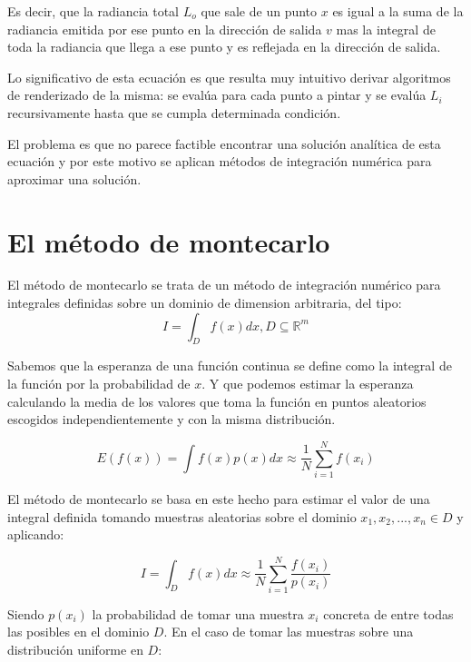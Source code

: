 Es decir, que la radiancia total $L_o$ que sale de un punto $x$ es igual a la suma de la radiancia emitida por ese punto en la dirección de salida $v$ mas la integral de toda la radiancia que llega a ese punto y es reflejada en la dirección de salida.
\medskip

Lo significativo de esta ecuación es que resulta muy intuitivo derivar algoritmos de renderizado de la misma: se evalúa para cada punto a pintar y se evalúa $L_i$ recursivamente hasta que se cumpla determinada condición.
\medskip

El problema es que no parece factible encontrar una solución analítica de esta ecuación y por este motivo se aplican métodos de integración numérica para aproximar una solución.

\clearpage

\section{El método de montecarlo}

El método de montecarlo se trata de un método de integración numérico para integrales definidas sobre un dominio de dimension arbitraria, del tipo:
\begin{equation}
I = \int_D f(x)dx , D \subseteq \mathbb{R}^m
\end{equation}

Sabemos que la esperanza de una función continua se define como la integral de la función por la probabilidad de $x$. Y que podemos estimar la esperanza calculando la media de los valores que toma la función en puntos aleatorios escogidos independientemente y con la misma distribución.

\begin{equation}
E(f(x)) = \int f(x)p(x)dx \approx \frac{1}{N} \sum _{i=1} ^N f(x_i) 
\end{equation}


El método de montecarlo se basa en este hecho para estimar el valor de una integral definida tomando muestras aleatorias sobre el dominio $x_1, x_2, ..., x_n \in D$ y aplicando:

\begin{equation}
\label{eq:montecarlo}
I = \int_D f(x)dx \approx \frac{1}{N} \sum _{i=1} ^N \frac{f(x_i)}{p(x_i)} 
\end{equation}

Siendo $p(x_i)$ la probabilidad de tomar una muestra $x_i$ concreta de entre todas las posibles en el dominio $D$. En el caso de tomar las muestras sobre una distribución uniforme en $D$:

